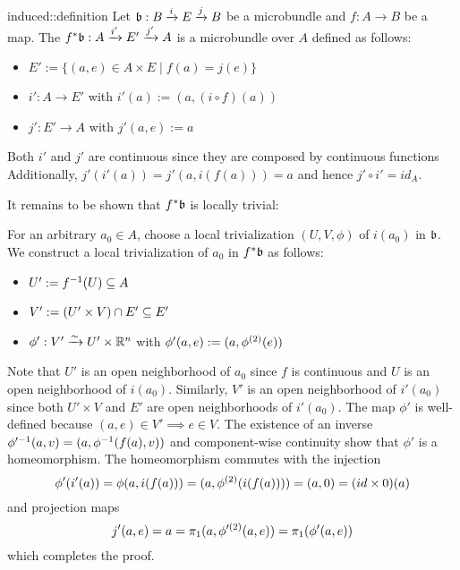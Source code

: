 \begin{mydefinition}{induced::definition}{}
    Let $\bb: \bundle{B}{E}{i}{j}$ be a microbundle and $f: A \to B$ be a map.
    The  $\bundledef{\ind{f}\bb}{A}{E'}{i'}{j'}$
    is a microbundle over $A$ defined as follows:
    \begin{itemize}
        \item $E' := \{ (a, e) \in A \times E \mid f(a) = j(e) \}$
        \item $i': A \to E'$ with $i'(a) := (a, (i \circ f)(a))$
        \item $j': E' \to A$ with $j'(a, e) := a$
    \end{itemize}
\end{mydefinition}

\begin{myproof}
    Both $i'$ and $j'$ are continuous since they are composed by continuous functions
    Additionally, $j'(i'(a)) = j'(a, i(f(a))) = a$ and hence $j' \circ i' = id_A$.

    It remains to be shown that $\ind{f}\bb$ is locally trivial:

    For an arbitrary $a_0 \in A$, choose a local trivialization $(U, V, \phi)$ of $i(a_0)$ in $\bb$.
    We construct a local trivialization of $a_0$ in $\ind{f}\bb$ as follows:
    \begin{itemize}
        \item $U' := \inv{f}(U) \sub A$
        \item $V' := (U' \times V) \cap E' \sub E'$
        \item $\phi': V' \isomto U' \times \R^n$ with $\phi'(a, e) := (a, \snd{\phi}(e))$
    \end{itemize}
    Note that $U'$ is an open neighborhood of $a_0$ since $f$ is continuous and $U$ is an open neighborhood of $i(a_0)$.
    Similarly, $V'$ is an open neighborhood of $i'(a_0)$ since both $U' \times V$ and $E'$ are open neighborhoods of $i'(a_0)$.
    The map $\phi'$ is well-defined because $(a, e) \in V' \implies e \in V$.
    The existence of an inverse $\inv{\phi'}(a, v) = (a, \inv{\phi}(f(a), v))$ and component-wise continuity show that $\phi'$ is a homeomorphism.
    The homeomorphism commutes with the injection
    \[ \phi'(i'(a)) = \phi(a, i(f(a))) = (a, \snd{\phi}(i(f(a)))) = (a, 0) = (id \times 0)(a) \]
    and projection maps
    \[ j'(a, e) = a  = \pi_1(a, \snd{\phi'}(a, e)) = \pi_1(\phi'(a, e)) \]
    which completes the proof. 
\end{myproof}